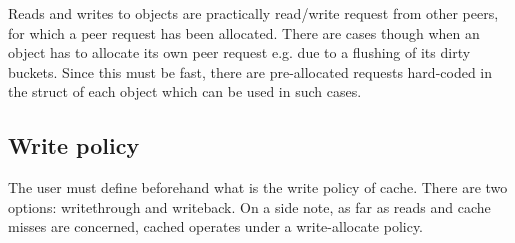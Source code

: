 Reads and writes to objects are practically read/write request from other
peers, for which a peer request has been allocated. There are cases though
when an object has to allocate its own peer request e.g. due to a flushing of
its dirty buckets. Since this must be fast, there are pre-allocated requests
hard-coded in the struct of each object which can be used in such cases.

\subsection{Write policy}

The user must define beforehand what is the write policy of cache. There are
two options: writethrough and writeback. On a side note, as far as reads and
cache misses are concerned, cached operates under a write-allocate policy.

